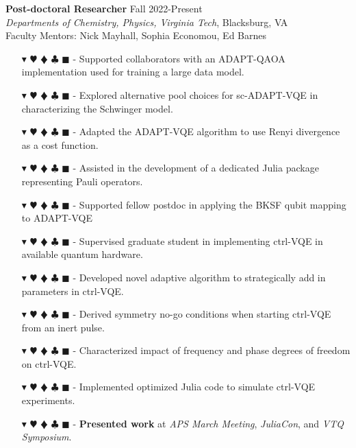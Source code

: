 \documentclass[overlapped, 10pt]{res} %
\newcommand{\physics}{$\blacktriangledown$}
\newcommand{\biochem}{$\varheartsuit$}
\newcommand{\shannon}{$\vardiamondsuit$}
\newcommand{\classic}{$\clubsuit$}
\newcommand{\quantum}{$\blacksquare$}
\newcommand{\physicscolor}{\color{YellowOrange}}
\newcommand{\biochemcolor}{\color{Emerald}}
\newcommand{\shannoncolor}{\color{Goldenrod}}
\newcommand{\classiccolor}{\color{Cyan}}
\newcommand{\quantumcolor}{\color{RedOrange}}
\newcommand{\tag}[1]{
    {\IfSubStr{#1}{\physics}{\physicscolor}{\color{White}}\physics}
    {\IfSubStr{#1}{\biochem}{\biochemcolor}{\color{White}}\biochem}
    {\IfSubStr{#1}{\shannon}{\shannoncolor}{\color{White}}\shannon}
    {\IfSubStr{#1}{\classic}{\classiccolor}{\color{White}}\classic}
    {\IfSubStr{#1}{\quantum}{\quantumcolor}{\color{White}}\quantum}
}
\begin{document}
\begin{resume}
\textbf{Post-doctoral Researcher} \hfill Fall 2022-Present \\
\textit{Departments of Chemistry, Physics, Virginia Tech}, Blacksburg, VA \\
Faculty Mentors: Nick Mayhall, Sophia Economou, Ed Barnes
\begin{itemize} \itemsep -2pt %
\item[\tag{\quantum}-] Supported collaborators with an ADAPT-QAOA implementation used for training a large data model.
\item[\tag{\physics\biochem\quantum}-] Explored alternative pool choices for sc-ADAPT-VQE in characterizing the Schwinger model.
\item[\tag{\physics\biochem\shannon\quantum}-] Adapted the ADAPT-VQE algorithm to use Renyi divergence as a cost function.
\item[\tag{\physics\biochem\classic\quantum}-] Assisted in the development of a dedicated Julia package representing Pauli operators.
\item[\tag{\physics\biochem\shannon\quantum}-] Supported fellow postdoc in applying the BKSF qubit mapping to ADAPT-VQE
\item[\tag{\physics\biochem\quantum}-] Supervised graduate student in implementing ctrl-VQE in available quantum hardware.
\item[\tag{\physics\biochem\quantum}-] Developed novel adaptive algorithm to strategically add in parameters in ctrl-VQE.
\item[\tag{\physics\biochem\quantum}-] Derived symmetry no-go conditions when starting ctrl-VQE from an inert pulse.
\item[\tag{\physics\biochem\classic\quantum}-] Characterized impact of frequency and phase degrees of freedom on ctrl-VQE.
\item[\tag{\physics\biochem\classic\quantum}-] Implemented optimized Julia code to simulate ctrl-VQE experiments.
\item[\tag{}-] \textbf{Presented work} at \textit{APS March Meeting}, \textit{JuliaCon}, and \textit{VTQ Symposium}.
\end{itemize}


\end{resume}
\end{document}
